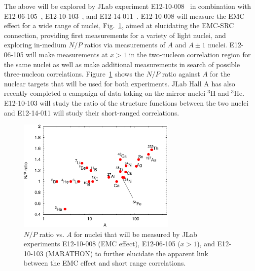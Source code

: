 The above will be explored by JLab experiment E12-10-008~\cite{12gev_emc} in combination
with E12-06-105~\cite{12gev_xgt1}, E12-10-103~\cite{mar}, and E12-14-011~\cite{tritsrc}. E12-10-008 will measure the EMC effect for a wide range of nuclei, Fig.~\ref{fig:np_ratios},
aimed at elucidating the EMC-SRC connection, providing first measurements for a variety of light nuclei,
and exploring in-medium $N/P$ ratios via measurements of $A$ and $A\pm1$ nuclei.  E12-06-105 will make
measurements at $x>1$ in the two-nucleon correlation region for the same nuclei as well as make additional
measurements in search of possible three-nucleon correlations. Figure~\ref{fig:np_ratios} shows the $N/P$
ratio against $A$ for the nuclear targets that will be used for both experiments.%
JLab Hall A has also recently completed a campaign of data taking on the mirror nuclei $^3$H and $^3$He. 
E12-10-103 will study the ratio of the structure functions between the two nuclei and 
E12-14-011 will study their short-ranged correlations.

\begin{figure}[tbp]
\includegraphics[width=\columnwidth,height=55mm]{plots/np_ratios_2017.pdf}
    \caption{$N/P$ ratio vs. $A$ for nuclei that will be measured by JLab experiments E12-10-008 (EMC effect), E12-06-105 ($x>1$), and E12-10-103 (MARATHON) to further elucidate the apparent link between the EMC effect and short range  correlations.}
\label{fig:np_ratios}
\end{figure}

